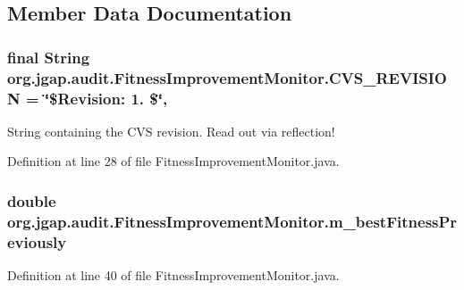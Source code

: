 \subsection{Member Data Documentation}
\hypertarget{classorg_1_1jgap_1_1audit_1_1_fitness_improvement_monitor_a5daafc482d22d150f131c24ca77bb266}{
\subsubsection[{C\-V\-S\-\_\-\-R\-E\-V\-I\-S\-I\-O\-N}]{\setlength{\rightskip}{0pt plus 5cm}final String org.\-jgap.\-audit.\-Fitness\-Improvement\-Monitor.\-C\-V\-S\-\_\-\-R\-E\-V\-I\-S\-I\-O\-N = \char`\"{}\$Revision\-: 1. \$\char`\"{}\hspace{0.3cm}{\ttfamily [static]}, {\ttfamily [private]}}}\label{classorg_1_1jgap_1_1audit_1_1_fitness_improvement_monitor_a5daafc482d22d150f131c24ca77bb266}
String containing the C\-V\-S revision. Read out via reflection! 

Definition at line 28 of file Fitness\-Improvement\-Monitor.\-java.

\hypertarget{classorg_1_1jgap_1_1audit_1_1_fitness_improvement_monitor_a30c75ab12250e7ce484b14b6f574dc2e}{
\subsubsection[{m\-\_\-best\-Fitness\-Previously}]{\setlength{\rightskip}{0pt plus 5cm}double org.\-jgap.\-audit.\-Fitness\-Improvement\-Monitor.\-m\-\_\-best\-Fitness\-Previously\hspace{0.3cm}{\ttfamily [private]}}}\label{classorg_1_1jgap_1_1audit_1_1_fitness_improvement_monitor_a30c75ab12250e7ce484b14b6f574dc2e}


Definition at line 40 of file Fitness\-Improvement\-Monitor.\-java.



